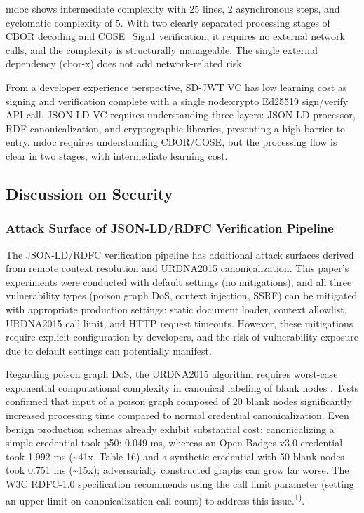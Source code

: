 \documentclass[conference]{IEEEtran}
\begin{document}
mdoc shows intermediate complexity with 25 lines, 2 asynchronous steps, and cyclomatic complexity of 5. With two clearly separated processing stages of CBOR decoding and COSE\_Sign1 verification, it requires no external network calls, and the complexity is structurally manageable. The single external dependency (cbor-x) does not add network-related risk.

From a developer experience perspective, SD-JWT VC has low learning cost as signing and verification complete with a single node:crypto Ed25519 sign/verify API call. JSON-LD VC requires understanding three layers: JSON-LD processor, RDF canonicalization, and cryptographic libraries, presenting a high barrier to entry. mdoc requires understanding CBOR/COSE, but the processing flow is clear in two stages, with intermediate learning cost.

\subsection{Discussion on Security}

\subsubsection{Attack Surface of JSON-LD/RDFC Verification Pipeline}

The JSON-LD/RDFC verification pipeline has additional attack surfaces derived from remote context resolution and URDNA2015 canonicalization. This paper's experiments were conducted with default settings (no mitigations), and all three vulnerability types (poison graph DoS, context injection, SSRF) can be mitigated with appropriate production settings: static document loader, context allowlist, URDNA2015 call limit, and HTTP request timeouts. However, these mitigations require explicit configuration by developers, and the risk of vulnerability exposure due to default settings can potentially manifest.

Regarding poison graph DoS, the URDNA2015 algorithm requires worst-case exponential computational complexity in canonical labeling of blank nodes \cite{ref9}. Tests confirmed that input of a poison graph composed of 20 blank nodes significantly increased processing time compared to normal credential canonicalization. Even benign production schemas already exhibit substantial cost: canonicalizing a simple credential took p50: 0.049 ms, whereas an Open Badges v3.0 credential took 1.992 ms (\textasciitilde41x, Table 16) and a synthetic credential with 50 blank nodes took 0.751 ms (\textasciitilde15x); adversarially constructed graphs can grow far worse. The W3C RDFC-1.0 specification recommends using the call limit parameter (setting an upper limit on canonicalization call count) to address this issue.\textsuperscript{1)}.
\end{document}
